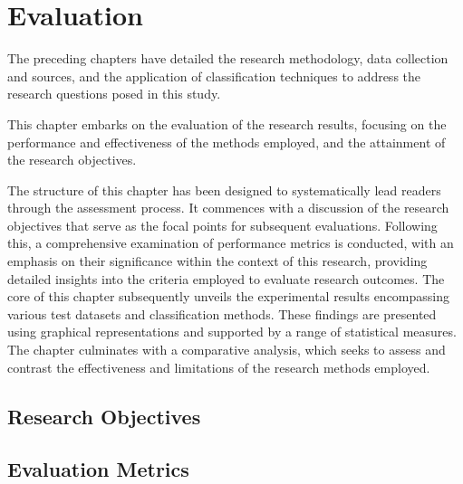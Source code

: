 \section{Evaluation}
\label{sec:evaluation}

The preceding chapters have detailed the research methodology, data collection and sources, and the application of classification techniques 
to address the research questions posed in this study. 

This chapter embarks on the evaluation of the research results, focusing on the performance and effectiveness of the methods employed, 
and the attainment of the research objectives.

The structure of this chapter has been designed to systematically lead readers through the assessment process. 
It commences with a discussion of the research objectives that serve as the focal points for subsequent evaluations. 
Following this, a comprehensive examination of performance metrics is conducted, with an emphasis on their 
significance within the context of this research, providing detailed insights into the criteria employed 
to evaluate research outcomes.
The core of this chapter subsequently unveils the experimental results encompassing various test datasets 
and classification methods. 
These findings are presented using graphical representations and supported by a range of statistical measures.
The chapter culminates with a comparative analysis, which seeks to assess and contrast the effectiveness and 
limitations of the research methods employed.

\subsection{Research Objectives}
\label{subsec:research_objectives}







\subsection{Evaluation Metrics}
\label{subsec:determinationInconcl}

